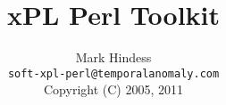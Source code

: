 \documentclass[12pt,a4paper]{article}
\title{xPL Perl Toolkit}
\author{Mark Hindess\\
  \texttt{soft-xpl-perl@temporalanomaly.com}\\
  Copyright (C) 2005, 2011}
\begin{document}
\newcommand{\comment}[1]{}
\setlength{\parindent}{0pt}
\addtolength{\parskip}{5pt}

\def\href#1#2{\special{html:<a href="#1">}{#2}\special{html:</a>}}
\def\url#1{\special{html:<a href="#1">}{\tt{#1}}\special{html:</a>}}
\def\msg#1{\texttt{#1}}
\def\method#1{\texttt{#1}}
\def\field#1{\texttt{#1}}
\def\cmd#1{\texttt{#1}}

\maketitle
\newpage
\tableofcontents
\end{document}
